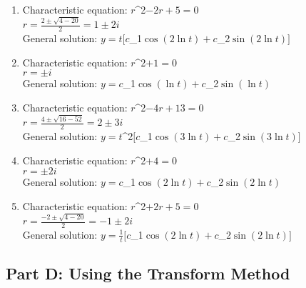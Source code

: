 \documentclass[12pt]{article}
\begin{document}
\begin{enumerate}[resume]
\item Characteristic equation: $r$^{2}$ - 2r + 5 = 0$\\
$r = \frac{2 \pm \sqrt{4-20}}{2} = 1 \pm 2i$\\
General solution: $y = t[c$_{1}$\cos(2\ln t) + c$_{2}$\sin(2\ln t)]$

\item Characteristic equation: $r$^{2}$ + 1 = 0$\\
$r = \pm i$\\
General solution: $y = c$_{1}$\cos(\ln t) + c$_{2}$\sin(\ln t)$

\item Characteristic equation: $r$^{2}$ - 4r + 13 = 0$\\
$r = \frac{4 \pm \sqrt{16-52}}{2} = 2 \pm 3i$\\
General solution: $y = t$^{2}$[c$_{1}$\cos(3\ln t) + c$_{2}$\sin(3\ln t)]$

\item Characteristic equation: $r$^{2}$ + 4 = 0$\\
$r = \pm 2i$\\
General solution: $y = c$_{1}$\cos(2\ln t) + c$_{2}$\sin(2\ln t)$

\item Characteristic equation: $r$^{2}$ + 2r + 5 = 0$\\
$r = \frac{-2 \pm \sqrt{4-20}}{2} = -1 \pm 2i$\\
General solution: $y = \frac{1}{t}[c$_{1}$\cos(2\ln t) + c$_{2}$\sin(2\ln t)]$
\end{enumerate}

\subsection*{Part D: Using the Transform Method}
\end{document}
